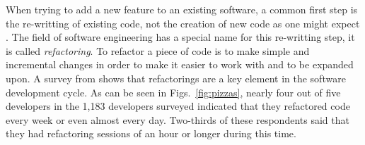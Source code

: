 When trying to add a new feature to an existing software, a common first step is the re-writting of existing code, not the creation of new code as one might expect \citep{martinfowler}. The field of software engineering has a special name for this re-writting step, it is called \textit{refactoring}. To refactor a piece of code is to make simple and incremental changes in order to make it easier to work with and to be expanded upon. A survey from \citet{1001} shows that refactorings are a key element in the software development cycle. As can be seen in Figs.~\ref{fig:pizzas}, nearly four out of five developers in the 1,183 developers surveyed indicated that they refactored code every week or even almost every day. Two-thirds of these respondents said that they had refactoring sessions of an hour or longer during this time.



